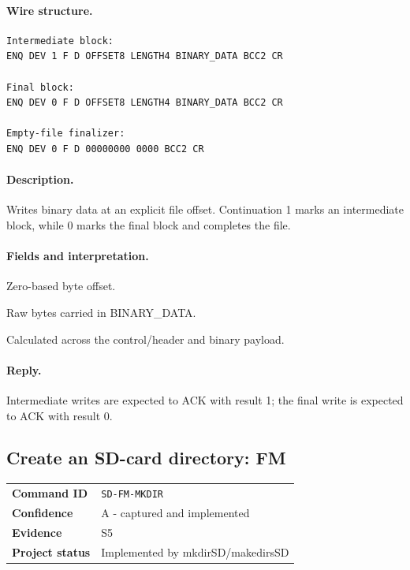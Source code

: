 \documentclass[10pt,letterpaper]{article}
\begin{document}
\paragraph{Wire structure.}
\begin{Verbatim}[breaklines=true,breakanywhere=true,fontsize=\small]
Intermediate block:
ENQ DEV 1 F D OFFSET8 LENGTH4 BINARY_DATA BCC2 CR

Final block:
ENQ DEV 0 F D OFFSET8 LENGTH4 BINARY_DATA BCC2 CR

Empty-file finalizer:
ENQ DEV 0 F D 00000000 0000 BCC2 CR
\end{Verbatim}
\paragraph{Description.} Writes binary data at an explicit file offset. Continuation 1 marks an intermediate block, while 0 marks the final block and completes the file.
\paragraph{Fields and interpretation.}
\begin{description}[style=nextline,leftmargin=3.2cm,labelwidth=3.0cm,font=\normalfont\bfseries]
\item[OFFSET8] Zero-based byte offset.
\item[LENGTH4] Raw bytes carried in BINARY\_DATA.
\item[BCC] Calculated across the control/header and binary payload.
\end{description}
\paragraph{Reply.} Intermediate writes are expected to ACK with result 1; the final write is expected to ACK with result 0.

\subsection{Create an SD-card directory: FM}
\begin{tabularx}{\textwidth}{@{}>{\bfseries}p{2.8cm}X@{}}
Command ID & \texttt{SD-FM-MKDIR} \\
Confidence & A - captured and implemented \\
Evidence & S5 \\
Project status & Implemented by mkdirSD/makedirsSD \\
\end{tabularx}
\vspace{0.35em}
\end{document}
